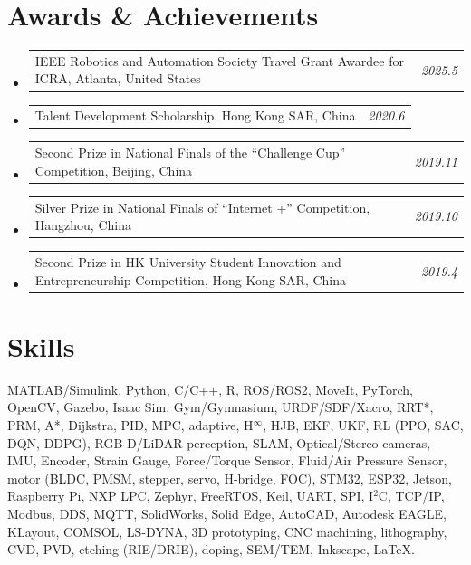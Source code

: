 \documentclass[a4paper,11pt]{article}
\makeatletter
\newcommand{\resumeProject}[2]{
  \vspace{0.5mm}\item
  \begin{tabular*}{0.98\textwidth}[t]{l@{\extracolsep{\fill}}r}
    \small{#1} & \textit{\footnotesize{#2}} \\
  \end{tabular*}
  \vspace{-2.4mm}
}
\newcommand{\resumeSubHeadingListStart}{\begin{itemize}[leftmargin=*,labelsep=0mm,itemsep=-2pt]}
\newcommand{\resumeSubHeadingListEnd}{\end{itemize}\vspace{2mm}}
\makeatother
\begin{document}
\section{\textbf{Awards \& Achievements}}
\vspace{-0.4mm}
\resumeSubHeadingListStart
  \resumeProject{IEEE Robotics and Automation Society Travel Grant Awardee for ICRA, Atlanta, United States}{2025.5}
  \resumeProject{Talent Development Scholarship, Hong Kong SAR, China}{2020.6}
  \resumeProject{Second Prize in National Finals of the “Challenge Cup” Competition, Beijing, China}{2019.11}
  \resumeProject{Silver Prize in National Finals of “Internet +” Competition, Hangzhou, China}{2019.10}
  \resumeProject{Second Prize in HK University Student Innovation and Entrepreneurship Competition, Hong Kong SAR, China}{2019.4}

\resumeSubHeadingListEnd
\vspace{-5mm}

\section{\textbf{Skills}}
\vspace{-0.4mm}

 \hspace{0.5em} MATLAB/Simulink, Python, C/C++, R, ROS/ROS2, MoveIt, PyTorch, OpenCV, Gazebo, Isaac Sim, Gym/Gymnasium, URDF/SDF/Xacro, RRT*, PRM, A*, Dijkstra, PID, MPC, adaptive, H$^\infty$, HJB, EKF, UKF, RL (PPO, SAC, DQN, DDPG), RGB-D/LiDAR perception, SLAM, Optical/Stereo cameras, IMU, Encoder, Strain Gauge, Force/Torque Sensor, Fluid/Air Pressure Sensor, motor (BLDC, PMSM, stepper, servo, H-bridge, FOC), STM32, ESP32, Jetson, Raspberry Pi, NXP LPC, Zephyr, FreeRTOS, Keil, UART, SPI, I$^2$C, TCP/IP, Modbus, DDS, MQTT, SolidWorks, Solid Edge, AutoCAD, Autodesk EAGLE, KLayout, COMSOL, LS-DYNA, 3D prototyping, CNC machining, lithography, CVD, PVD, etching (RIE/DRIE), doping, SEM/TEM, Inkscape, \LaTeX.


\end{document}

